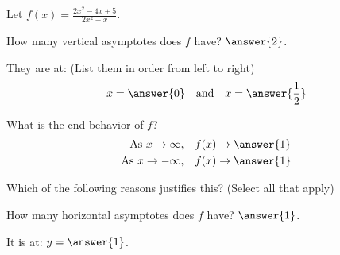 \documentclass{ximera}
\author{Bobby Ramsey}
\begin{document}
Let $\displaystyle f(x) = \frac{2x^2-4x+5}{2x^2-x}$.

\begin{exercise}
	How many vertical asymptotes does $f$ have?   $\answer{2}$.
	\begin{exercise}
		They are at: (List them in order from left to right)
		$$ x = \answer{0}  \quad \text{and} \quad x = \answer{\frac{1}{2}} $$
	\end{exercise}
\end{exercise}

\begin{exercise}
	What is the end behavior of $f$?
	\begin{align*}
		\text{As} \,\, x \to \infty, &\quad f(x) \to \answer{1}\\
		\text{As} \,\, x \to -\infty, &\quad f(x) \to \answer{1}\\
	\end{align*}
	\begin{exercise}	
		Which of the following reasons justifies this?  (Select all that apply)
		\begin{selectAll}
		\end{selectAll}
	\end{exercise}	
\end{exercise}

\begin{exercise}
	How many horizontal asymptotes does $f$ have?	$\answer{1}$.
	\begin{exercise}
		It is at: $y = \answer{1}$. 
		
	\end{exercise}
\end{exercise}
\end{document}
